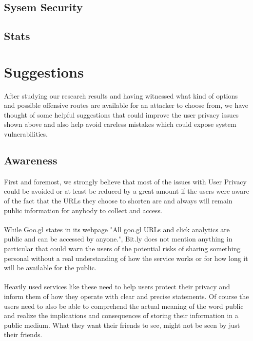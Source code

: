 \documentclass[12pt]{article}
\begin{document}
\subsection{Sysem Security}

\subsection{Stats}

\section{Suggestions}

\paragraph{}
 After studying our research results and having witnessed what kind of options and possible offensive routes are available for an attacker to choose from, we have thought of some helpful suggestions that could improve the user privacy issues shown above and also help avoid careless mistakes which could expose system vulnerabilities.

\subsection{Awareness}

\paragraph{}
 First and foremost, we strongly believe that most of the issues with User Privacy could be avoided or at least be reduced by a great amount if the users were aware of the fact that the URLs they choose to shorten are and always will remain public information for anybody to collect and access.
 
\paragraph{}
 While Goo.gl states in its webpage "All goo.gl URLs and click analytics are public and can be accessed by anyone.", Bit.ly does not mention anything in particular that could warn the users of the potential risks of sharing something personal without a real understanding of how the service works or for how long it will be available for the public.

\paragraph{}
 Heavily used services like these need to help users protect their privacy and inform them of how they operate with clear and precise statements. Of course the users need to also be able to comprehend the actual meaning of the word public and realize the implications and consequences of storing their information in a public medium. What they want their friends to see, might not be seen by just their friends.
\end{document}
